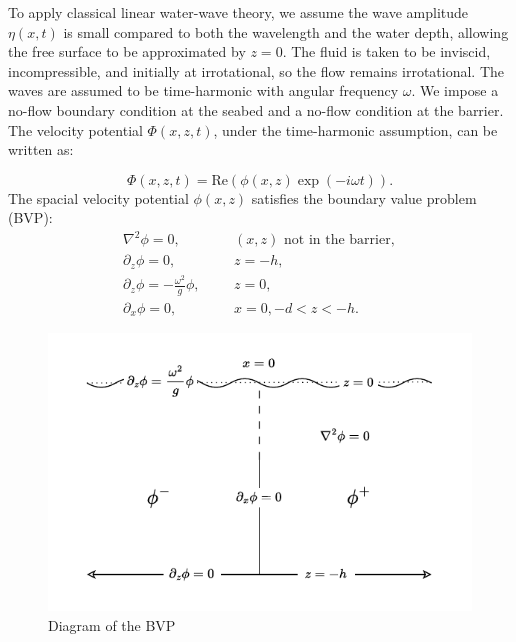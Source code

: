 \documentclass[a4paper,12pt]{report}
\begin{document}
To apply classical linear water-wave theory, we assume the wave amplitude $\eta(x,t)$ is small compared to both the wavelength and the water depth, allowing the free surface to be approximated by $z=0$. The fluid is taken to be inviscid, incompressible, and initially at irrotational, so the flow remains irrotational. The waves are assumed to be time-harmonic with angular frequency $\omega$. We impose a no-flow boundary condition at the seabed and a no-flow condition at the barrier. The velocity potential $\Phi(x,z,t)$, under the time-harmonic assumption, can be written as:

\begin{equation}
\label{eq:time-harmonic}
\Phi(x,z,t) = \text{Re}(\phi(x,z)\exp(-i\omega t)).
\end{equation}
The spacial velocity potential $\phi(x,z)$ satisfies the boundary value problem (BVP):
\begin{align}
\label{eq:irrotational}
\nabla^2 \phi = 0,&  &&(x,z) \text{ not in the barrier}, \\
\label{eq:noFlowGround}
\partial_z \phi = 0,&  &&z = -h, \\
\label{eq:freeSurface}
\partial_z \phi = -\frac{\omega^2}{g}\phi,&  &&z = 0, \\
\label{eq:noFlowBarrier}
\partial_x \phi= 0,&  &&x = 0, -d < z < -h.
\end{align}

\begin{figure}[h]
\centering
\includegraphics[width=12cm]{bvp-figure.pdf}
\caption{Diagram of the BVP}
\label{fig:bvp}
\end{figure}
\end{document}

